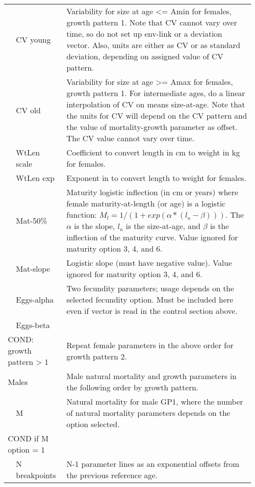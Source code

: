 \begin{longtable}{p{1cm} p{2.25cm} p{10cm}}
    \Tstrut & CV young & Variability for size at age <= Amin for females, growth pattern 1.  Note that CV cannot vary over time, so do not set up env-link or a deviation vector.  Also, units are either as CV or as standard deviation, depending on assigned value of CV pattern.\\
	& CV old & Variability for size at age >= Amax for females, growth pattern 1. For intermediate ages, do a linear interpolation of CV on means size-at-age.  Note that the units for CV will depend on the CV pattern and the value of mortality-growth parameter as offset. The CV value cannot vary over time.\Bstrut\\
	\hline

	\Tstrut & WtLen scale & Coefficient to convert length in cm to weight in kg for females.\\
	& WtLen exp & Exponent in to convert length to weight for females.\\
	& Mat-50\% & Maturity logistic inflection (in cm or years) where female maturity-at-length (or age) is a logistic function: $M_{l} = 1/(1+exp(\alpha*(l_{a} - \beta)))$. The $\alpha$ is the slope, $l_{a}$ is the size-at-age, and $\beta$ is the inflection of the maturity curve. Value ignored for maturity option 3, 4, and 6. \\ 
	& Mat-slope & Logistic slope (must have negative value). Value ignored for maturity option 3, 4, and 6.\\
	& Eggs-alpha & Two fecundity parameters; usage depends on the selected fecundity option.  Must be included here even if vector is read in the control section above.\\
	& Eggs-beta & \Bstrut\\
	\hline

	\multicolumn{2}{l}{COND: growth pattern > 1} \Tstrut & Repeat female parameters in the above order for growth pattern 2.\Bstrut\\
	\hline

	\multicolumn{2}{l}{Males} \Tstrut & Male natural mortality and growth parameters in the following order by growth pattern. \Bstrut\\
	& M & Natural mortality for male GP1, where the number of natural mortality parameters depends on the option selected. \Bstrut\\
	\hline
	\multicolumn{2}{l}{COND if M option = 1 } & \Tstrut\\
	& N breakpoints & N-1 parameter lines as an exponential offsets from the previous reference age.\Bstrut\\
	\hline
		

\end{longtable}
